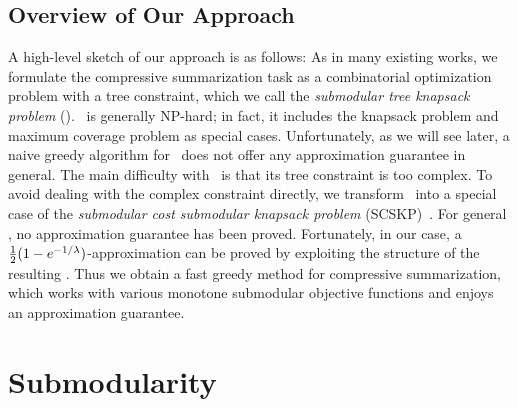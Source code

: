 \documentclass[11pt,a4paper]{article}
\begin{document}
	\subsection{Overview of Our Approach}
	A high-level sketch of our approach is as follows: 
	As in many existing works,  
	we formulate the compressive summarization task 
	as a combinatorial optimization problem with a tree constraint, 
	which we call the {\it submodular tree knapsack problem} (\stkp). 
	\stkp\ is generally NP-hard; 
	in fact, it includes the knapsack problem and 
	maximum coverage problem as special cases. 
	Unfortunately, as we will see later, 
	a naive greedy algorithm for \stkp\ 
	does not offer any approximation guarantee in general. 
	The main difficulty with \stkp\ is that 
	its {tree constraint} is too complex. 
	To avoid dealing with the complex constraint directly,  
	we transform \stkp\ into a special case of the 
	{\it submodular cost submodular knapsack problem} (SCSKP)~\cite{iyer2013submodular}. 
	For general \scskp,  
	no approximation guarantee has been proved.  
	Fortunately, in our case, 
	a $\frac{1}{2}(1-e^{-1/\lambda})$-approximation  
	can be proved by exploiting the structure of 
	the resulting \scskp. 
	Thus we obtain a fast greedy method for 
	compressive summarization, 
	which  
	works with various monotone submodular objective functions
	and enjoys an approximation guarantee. 
	
	
	
	
	\section{Submodularity}
	
	
\end{document}
